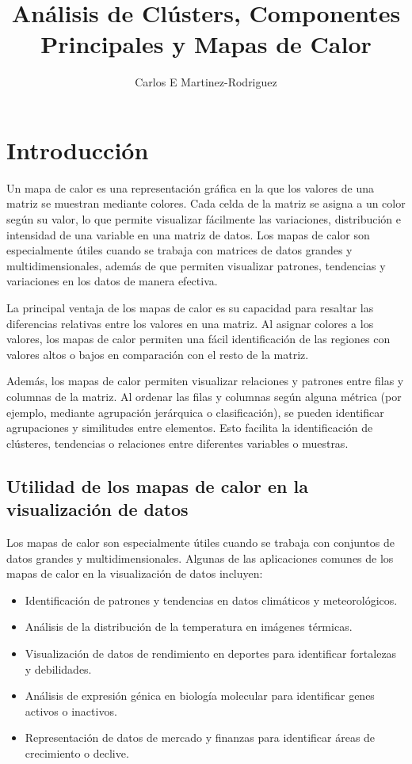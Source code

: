 \documentclass{article}
\title{An\'alisis de Cl\'usters, Componentes Principales y Mapas de Calor}
\author{Carlos E Martinez-Rodriguez}
\begin{document}
\maketitle
\tableofcontents
\medskip

\section{Introducción}

Un mapa de calor es una representación gráfica en la que los valores de una matriz se muestran mediante colores. Cada celda de la matriz se asigna a un color según su valor, lo que permite visualizar fácilmente las variaciones, distribuci\'on e intensidad de una variable en una matriz de datos. Los mapas de calor son especialmente útiles cuando se trabaja con matrices de datos grandes y multidimensionales, adem\'as de que  permiten visualizar patrones, tendencias y variaciones en los datos de manera efectiva.\medskip

 La principal ventaja de los mapas de calor es su capacidad para resaltar las diferencias relativas entre los valores en una matriz. Al asignar colores a los valores, los mapas de calor permiten una fácil identificación de las regiones con valores altos o bajos en comparación con el resto de la matriz. \medskip
 
Además, los mapas de calor permiten visualizar relaciones y patrones entre filas y columnas de la matriz. Al ordenar las filas y columnas según alguna métrica (por ejemplo, mediante agrupación jerárquica o clasificación), se pueden identificar agrupaciones y similitudes entre elementos. Esto facilita la identificación de clústeres, tendencias o relaciones entre diferentes variables o muestras.


\subsection{Utilidad de los mapas de calor en la visualización de datos}
Los mapas de calor son especialmente útiles cuando se trabaja con conjuntos de datos grandes y multidimensionales. Algunas de las aplicaciones comunes de los mapas de calor en la visualización de datos incluyen:

\begin{itemize}
    \item Identificación de patrones y tendencias en datos climáticos y meteorológicos.
    \item Análisis de la distribución de la temperatura en imágenes térmicas.
    \item Visualización de datos de rendimiento en deportes para identificar fortalezas y debilidades.
    \item Análisis de expresión génica en biología molecular para identificar genes activos o inactivos.
    \item Representación de datos de mercado y finanzas para identificar áreas de crecimiento o declive.
\end{itemize}
\end{document}
